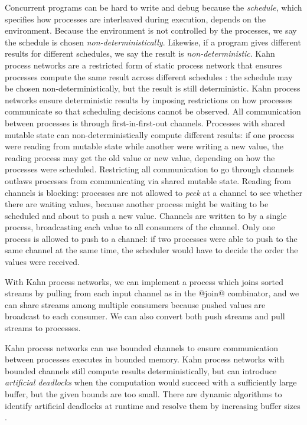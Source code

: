 Concurrent programs can be hard to write and debug because the \emph{schedule}, which specifies how processes are interleaved during execution, depends on the environment.
Because the environment is not controlled by the processes, we say the schedule is chosen \emph{non-deterministically}.
Likewise, if a program gives different results for different schedules, we say the result is \emph{non-deterministic}.
Kahn process networks are a restricted form of static process network that ensures processes compute the same result across different schedules \cite{kahn1976coroutines}: the schedule may be chosen non-deterministically, but the result is still deterministic.
Kahn process networks ensure deterministic results by imposing restrictions on how processes communicate so that scheduling decisions cannot be observed.
All communication between processes is through first-in-first-out channels.
Processes with shared mutable state can non-deterministically compute different results: if one process were reading from mutable state while another were writing a new value, the reading process may get the old value or new value, depending on how the processes were scheduled.
Restricting all communication to go through channels outlaws processes from communicating via shared mutable state.
Reading from channels is blocking: processes are not allowed to \emph{peek} at a channel to see whether there are waiting values, because another process might be waiting to be scheduled and about to push a new value.
Channels are written to by a single process, broadcasting each value to all consumers of the channel.
Only one process is allowed to push to a channel: if two processes were able to push to the same channel at the same time, the scheduler would have to decide the order the values were received.

With Kahn process networks, we can implement a process which joins sorted streams by pulling from each input channel as in the @join@ combinator, and we can share streams among multiple consumers because pushed values are broadcast to each consumer.
We can also convert both push streams and pull streams to processes.

Kahn process networks can use bounded channels to ensure communication between processes executes in bounded memory.
Kahn process networks with bounded channels still compute results deterministically, but can introduce \emph{artificial deadlocks} when the computation would succeed with a sufficiently large buffer, but the given bounds are too small.
There are dynamic algorithms to identify artificial deadlocks at runtime and resolve them by increasing buffer sizes \cite{parks1995bounded,geilen2003requirements}.


